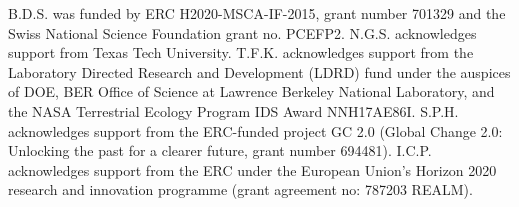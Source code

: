 \documentclass[gmd, manuscript]{copernicus}
\begin{document}




\begin{acknowledgements}
B.D.S. was funded by ERC H2020-MSCA-IF-2015, grant number 701329 and the Swiss National Science Foundation grant no. PCEFP2. N.G.S. acknowledges support from Texas Tech University. T.F.K. acknowledges support from the Laboratory Directed Research and Development (LDRD) fund under the auspices of DOE, BER Office of Science at Lawrence Berkeley National Laboratory, and the NASA Terrestrial Ecology Program IDS Award NNH17AE86I. S.P.H. acknowledges support from the ERC-funded project GC 2.0 (Global Change 2.0: Unlocking the past for a clearer future, grant number 694481). I.C.P. acknowledges support from the ERC under the European Union’s Horizon 2020 research and innovation programme (grant agreement no: 787203 REALM). 
\end{acknowledgements}









\end{document}
